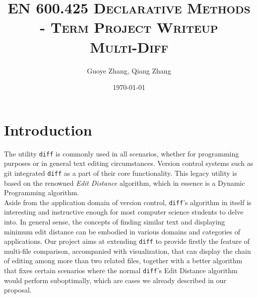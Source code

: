 \documentclass{article}
\begin{document}
\title{\textsc{EN 600.425 Declarative Methods \\ - Term Project Writeup}\\ \textbf{\textsc{Multi-Diff}}}
\author{Guoye Zhang, Qiang Zhang}
\date{\today}
\maketitle

\section{Introduction}
The utility \texttt{diff} is commonly used in all scenarios, whether for programming purposes or in general text editing circumstances. Version control systems such as git integrated \texttt{diff} as a part of their core functionality. This legacy utility is based on the renowned \textit{Edit Distance} algorithm, which in essence is a Dynamic Programming algorithm. \\

Aside from the application domain of version control, \texttt{diff}'s algorithm in itself is interesting and instructive enough for most computer science students to delve into. In general sense, the concepts of finding similar text and displaying minimum edit distance can be embodied in various domains and categories of applications. Our project aims at extending \texttt{diff} to provide firstly the feature of multi-file comparison, accompanied with visualization, that can display the chain of editing among more than two related files, together with a better algorithm that fixes certain scenarios where the normal \texttt{diff}'s Edit Distance algorithm would perform suboptimally, which are cases we already described in our proposal.\\
\end{document}
